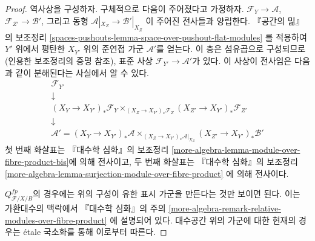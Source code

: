 \begin{proof}
역사상을 구성하자. 구체적으로 다음이 주어졌다고 가정하자.
$\mathcal{F}_Y \to \mathcal{A}$,
$\mathcal{F}_{Z'} \to \mathcal{B}'$, 그리고 동형
$\mathcal{A}|_{X_Z} \to \mathcal{B}'|_{X_Z}$
이 주어진 전사들과 양립한다. 『공간의 밂』의 보조정리
\ref{spaces-pushouts-lemma-space-over-pushout-flat-modules}
를 적용하여 $Y'$ 위에서 평탄한 $X_{Y'}$ 위의 준연접 가군
$\mathcal{A}'$를 얻는다. 이 층은 섬유곱으로 구성되므로(인용한 보조정리의
증명 참조), 표준 사상 $\mathcal{F}_{Y'} \to \mathcal{A}'$가 있다.
이 사상이 전사임은 다음과 같이 분해된다는 사실에서 알 수 있다.
$$
\begin{matrix}
\mathcal{F}_{Y'} \\
\downarrow \\
(X_Y \to X_{Y'})_*\mathcal{F}_Y
\times_{(X_Z \to X_{Y'})_*\mathcal{F}_Z}
(X_{Z'} \to X_{Y'})_*\mathcal{F}_{Z'} \\
\downarrow \\
\mathcal{A}' =
(X_Y \to X_{Y'})_*\mathcal{A}
\times_{(X_Z \to X_{Y'})_*\mathcal{A}|_{X_Z}}
(X_{Z'} \to X_{Y'})_*\mathcal{B}'
\end{matrix}
$$
첫 번째 화살표는 『대수학 심화』의 보조정리
\ref{more-algebra-lemma-module-over-fibre-product-bis}에 의해 전사이고,
두 번째 화살표는 『대수학 심화』의 보조정리
\ref{more-algebra-lemma-surjection-module-over-fibre-product}
에 의해 전사이다.

\medskip\noindent
$Q^{fp}_{\mathcal{F}/X/B}$의 경우에는 위의 구성이 유한 표시 가군을
만든다는 것만 보이면 된다. 이는 가환대수의 맥락에서 『대수학 심화』의 주의
\ref{more-algebra-remark-relative-modules-over-fibre-product}
에 설명되어 있다. 대수공간 위의 가군에 대한 현재의 경우는
\'etale 국소화를 통해 이로부터 따른다.
\end{proof}

